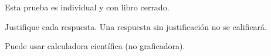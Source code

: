 \documentclass{emate-ucr}
\begin{document}
\imprimirtitulo

\datosestudiante

\begin{instrucciones}
  \item Esta prueba es individual y con libro cerrado.
  \item Justifique cada respuesta. Una respuesta sin justificación no se
        calificará.
  \item Puede usar calculadora científica (no graficadora).
\end{instrucciones}
\end{document}
